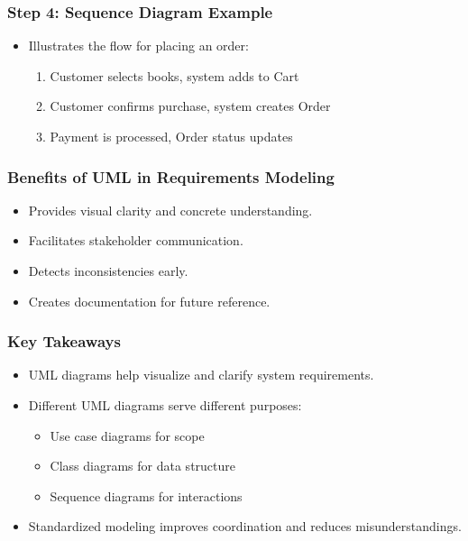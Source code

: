 \documentclass{beamer}
\begin{document}
\begin{frame}[fragile]
    \frametitle{Step 4: Sequence Diagram Example}
    \begin{itemize}
        \item Illustrates the flow for placing an order:
        \begin{enumerate}
            \item Customer selects books, system adds to Cart
            \item Customer confirms purchase, system creates Order
            \item Payment is processed, Order status updates
        \end{enumerate}
    \end{itemize}
\end{frame}

\begin{frame}[fragile]
    \frametitle{Benefits of UML in Requirements Modeling}
    \begin{itemize}
        \item Provides visual clarity and concrete understanding.
        \item Facilitates stakeholder communication.
        \item Detects inconsistencies early.
        \item Creates documentation for future reference.
    \end{itemize}
\end{frame}

\begin{frame}[fragile]
    \frametitle{Key Takeaways}
    \begin{itemize}
        \item UML diagrams help visualize and clarify system requirements.
        \item Different UML diagrams serve different purposes:
        \begin{itemize}
            \item Use case diagrams for scope
            \item Class diagrams for data structure
            \item Sequence diagrams for interactions
        \end{itemize}
        \item Standardized modeling improves coordination and reduces misunderstandings.
    \end{itemize}
\end{frame}
\end{document}
